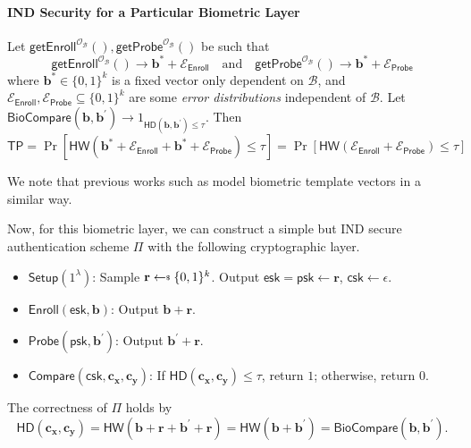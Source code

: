 \paragraph{IND Security for a Particular Biometric Layer}

Let $\textsf{getEnroll}^{\mathcal{O}_{\mathcal{B}}}(), \textsf{getProbe}^{\mathcal{O}_{\mathcal{B}}}()$ be such that
\[
	\textsf{getEnroll}^{\mathcal{O}_{\mathcal{B}}}() \to \mathbf{b}^* + \mathcal{E}_{\textsf{Enroll}}  \quad \text{and} \quad \textsf{getProbe}^{\mathcal{O}_{\mathcal{B}}}() \to \mathbf{b}^* + \mathcal{E}_{\textsf{Probe}}
\]
where $\mathbf{b}^* \in \{0, 1\}^k$ is a fixed vector only dependent on $\mathcal{B}$, and $\mathcal{E}_{\textsf{Enroll}}, \mathcal{E}_{\textsf{Probe}} \subseteq \{0, 1\}^k$ are some \emph{error distributions} independent of $\mathcal{B}$. Let $\textsf{BioCompare}(\mathbf{b}, \mathbf{b}^\prime) \to 1_{\textsf{HD}(\mathbf{b}, \mathbf{b}^\prime) \leq \tau}$. Then
\[
	\textsf{TP} = \Pr[ \textsf{HW}(\mathbf{b}^* + \mathcal{E}_{\textsf{Enroll}} + \mathbf{b}^* + \mathcal{E}_{\textsf{Probe}}) \leq \tau ] = \Pr[ \textsf{HW}(\mathcal{E}_{\textsf{Enroll}} + \mathcal{E}_{\textsf{Probe}}) \leq \tau ]
\]

\noindent We note that previous works such as \cite{10.1145/1030083.1030096,cryptoeprint:2014/394} model biometric template vectors in a similar way.

Now, for this biometric layer, we can construct a simple but IND secure authentication scheme $\Pi$ with the following cryptographic layer.

\begin{itemize}

	\item $\textsf{Setup} (1^\lambda)$: Sample $\mathbf{r} \getsdollar \{0, 1\}^k$. Output $\textsf{esk} = \textsf{psk} \gets \mathbf{r}$, $\textsf{csk} \gets \epsilon$.

	\item $\textsf{Enroll}(\textsf{esk}, \mathbf{b})$: Output $\mathbf{b} + \mathbf{r}$.
	
	\item $\textsf{Probe}(\textsf{psk}, \mathbf{b}^\prime)$: Output $\mathbf{b}^\prime + \mathbf{r}$.

	\item $\textsf{Compare} (\textsf{csk}, \mathbf{c_x}, \mathbf{c_y})$: If $\textsf{HD}(\mathbf{c_x}, \mathbf{c_y}) \leq \tau$, return $1$; otherwise, return $0$. 

\end{itemize}
The correctness of $\Pi$ holds by
\[
	\textsf{HD}(\mathbf{c_x}, \mathbf{c_y}) = \textsf{HW}(\mathbf{b} + \mathbf{r} + \mathbf{b}^\prime + \mathbf{r}) = \textsf{HW}(\mathbf{b} + \mathbf{b}^\prime) = \textsf{BioCompare}(\mathbf{b}, \mathbf{b}^\prime).
\]

